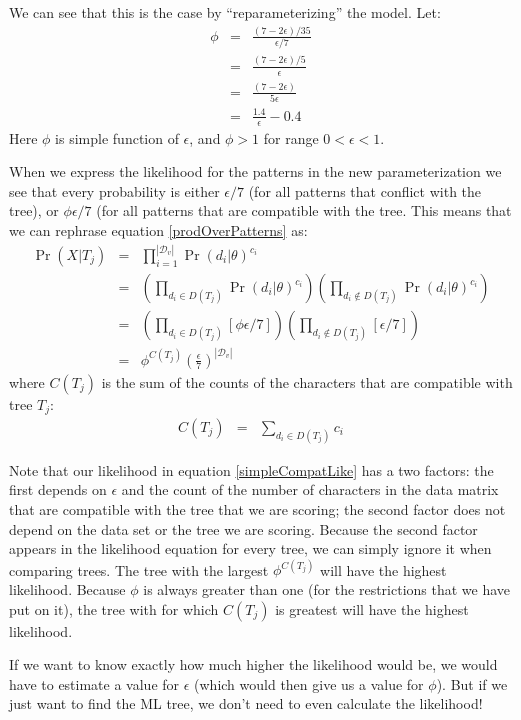 \documentclass[11pt]{article}
\newcommand{\variablePatternSpace}{\ensuremath{\mathcal{D}_v}}
\begin{document}
We can see that this is the case by ``reparameterizing'' the model.
Let:
\begin{eqnarray}
	\phi & = & \frac{(7-2\epsilon)/35}{\epsilon/7} \\
		& = & \frac{(7-2\epsilon)/5}{\epsilon}\\
		& = & \frac{(7-2\epsilon)}{5\epsilon} \\
		& = & \frac{1.4}{\epsilon} - 0.4
\end{eqnarray}
Here $\phi$ is simple function of $\epsilon$, and $\phi > 1$ for range $0<\epsilon < 1$.

When we express the likelihood for the patterns in the new parameterization we see that every
probability is either $\epsilon/7$ (for all patterns that conflict with the tree), or $\phi\epsilon/7$
(for all patterns that are compatible with the tree.
This means that we can rephrase equation \ref{prodOverPatterns} as:
\begin{eqnarray}
	\Pr(X|T_j)  & = & \prod_{i=1}^{|\variablePatternSpace|}\Pr(d_i|\theta)^{c_i} \\
				& = & \left(\prod_{d_i\in D(T_j)}\Pr(d_i|\theta)^{c_i} \right) \left(\prod_{d_i\notin D(T_j)}\Pr(d_i|\theta)^{c_i} \right)\\
				& = & \left(\prod_{d_i\in D(T_j)}[\phi\epsilon/7] \right) \left(\prod_{d_i\notin D(T_j)}[\epsilon/7] \right)\\
				& = & \phi^{C(T_j)}\left(\frac{\epsilon}{7}\right)^{| \variablePatternSpace|} \label{simpleCompatLike}
\end{eqnarray}
where $C(T_j)$ is the sum of the counts of the characters that are compatible with tree $T_j$:
\begin{eqnarray}
	C(T_j)  & = & \sum_{d_i\in D(T_j)}c_i
\end{eqnarray}

Note that our likelihood in equation \ref{simpleCompatLike} has a two factors:
the first depends on $\epsilon$ and the count of the number of characters in the data matrix that are
compatible with the tree that we are scoring;
the second factor does not depend on the data set or the tree we are scoring.
Because the second factor appears in the likelihood equation for every tree, we can simply ignore it
when comparing trees.
The tree with the largest $\phi^{C(T_j)}$ will have the highest likelihood.
Because $\phi$ is always greater than one (for the restrictions that we have put on it),
the tree with for which $C(T_j)$ is greatest will have the highest likelihood.

If we want to know exactly how much higher the likelihood would be, we would have to estimate a value
for $\epsilon$ (which would then give us a value for $\phi$).
But if we just want to find the ML tree, we don't need to even calculate the likelihood!
\end{document}

